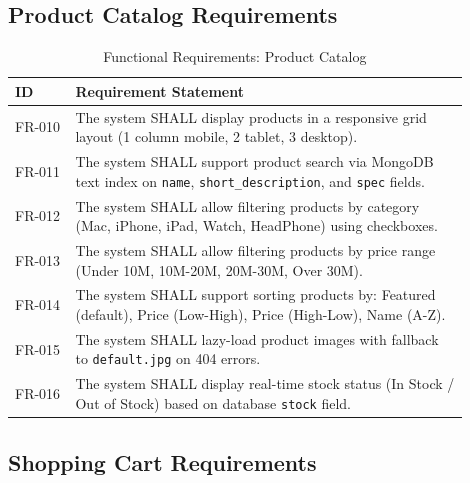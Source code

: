 \subsection{Product Catalog Requirements}

\begin{table}[H]
\centering
\caption{Functional Requirements: Product Catalog}
\label{tab:fr_products}
\small
\begin{tabular}{@{}p{0.12\linewidth}p{0.78\linewidth}@{}}
\toprule
\textbf{ID} & \textbf{Requirement Statement} \\
\midrule
FR-010 & The system SHALL display products in a responsive grid layout (1 column mobile, 2 tablet, 3 desktop). \\
FR-011 & The system SHALL support product search via MongoDB text index on \texttt{name}, \texttt{short\_description}, and \texttt{spec} fields. \\
FR-012 & The system SHALL allow filtering products by category (Mac, iPhone, iPad, Watch, HeadPhone) using checkboxes. \\
FR-013 & The system SHALL allow filtering products by price range (Under 10M, 10M-20M, 20M-30M, Over 30M). \\
FR-014 & The system SHALL support sorting products by: Featured (default), Price (Low-High), Price (High-Low), Name (A-Z). \\
FR-015 & The system SHALL lazy-load product images with fallback to \texttt{default.jpg} on 404 errors. \\
FR-016 & The system SHALL display real-time stock status (In Stock / Out of Stock) based on database \texttt{stock} field. \\
\bottomrule
\end{tabular}
\end{table}

\subsection{Shopping Cart Requirements}

